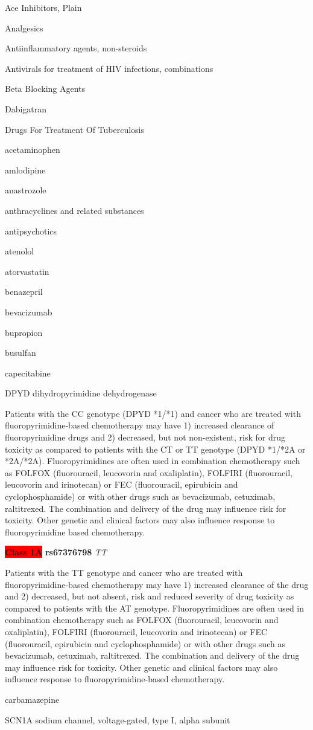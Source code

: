\documentclass{resume} %
\begin{document}
\begin{rSection}{ Ace Inhibitors, Plain }
\begin{rSection}{ Analgesics }
\begin{rSection}{ Antiinflammatory agents, non-steroids }
\begin{rSection}{ Antivirals for treatment of HIV infections, combinations }
\begin{rSection}{ Beta Blocking Agents }
\begin{rSection}{ Dabigatran }
\begin{rSection}{ Drugs For Treatment Of Tuberculosis }
\begin{rSection}{ acetaminophen }
\begin{rSection}{ amlodipine }
\begin{rSection}{ anastrozole }
\begin{rSection}{ anthracyclines and related substances }
\begin{rSection}{ antipsychotics }
\begin{rSection}{ atenolol }
\begin{rSection}{ atorvastatin }
\begin{rSection}{ benazepril }
\begin{rSection}{ bevacizumab }
\begin{rSection}{ bupropion }
\begin{rSection}{ busulfan }
\begin{rSection}{ capecitabine }
\begin{rSubsection}{ DPYD }{ dihydropyrimidine dehydrogenase }{}{}
\item[] Patients with the CC genotype (DPYD *1/*1) and cancer who are treated with fluoropyrimidine-based chemotherapy may have 1) increased clearance of fluoropyrimidine drugs and 2) decreased, but not non-existent, risk for drug toxicity as compared to patients with the CT or TT genotype (DPYD *1/*2A or *2A/*2A). Fluoropyrimidines are often used in combination chemotherapy such as FOLFOX (fluorouracil, leucovorin and oxaliplatin), FOLFIRI (fluorouracil,  leucovorin and irinotecan) or FEC (fluorouracil, epirubicin and cyclophosphamide) or with other drugs such as bevacizumab, cetuximab, raltitrexed. The combination and delivery of the drug may influence risk for toxicity. Other genetic and clinical factors may also influence response to fluoropyrimidine based chemotherapy.\item \textbf{\colorbox{red} {Class 1A}} \textbf{ rs67376798 } \textit{ TT }
\item[] Patients with the TT genotype and cancer who are treated with fluoropyrimidine-based chemotherapy may have 1) increased clearance of the drug and 2) decreased, but not absent, risk and reduced severity of drug toxicity as compared to patients with the AT genotype. Fluoropyrimidines are often used in combination chemotherapy such as FOLFOX (fluorouracil, leucovorin and oxaliplatin), FOLFIRI (fluorouracil, leucovorin and irinotecan) or FEC (fluorouracil, epirubicin and cyclophosphamide) or with other drugs such as bevacizumab, cetuximab, raltitrexed. The combination and delivery of the drug may influence risk for toxicity. Other genetic and clinical factors may also influence response to fluoropyrimidine-based chemotherapy.
\end{rSubsection}
\end{rSection}\begin{rSection}{ carbamazepine }
\item[]
\begin{rSubsection}{ SCN1A }{ sodium channel, voltage-gated, type I, alpha subunit }{}{}
\item[]


\end{rSubsection}
\end{rSection}
\end{rSection}
\end{rSection}
\end{rSection}
\end{rSection}
\end{rSection}
\end{rSection}
\end{rSection}
\end{rSection}
\end{rSection}
\end{rSection}
\end{rSection}
\end{rSection}
\end{rSection}
\end{rSection}
\end{rSection}
\end{rSection}
\end{rSection}
\end{rSection}
\end{document}
